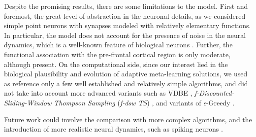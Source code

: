 Despite the promising results, there are some limitations to the model. First and foremost, the great level of abstraction in the neuronal details, as we considered simple point neurons with synapses modeled with relatively elementary functions.
In particular, the model does not account for the presence of noise in the neural dynamics, which is a well-known feature of biological neurons \cite{faisalNoiseNeuronsOther2012}.
Further, the functional association with the pre-frontal cortical region is only moderate, although present.
On the computational side, since our interest lied in the biological plausibility and evolution of adaptive meta-learning solutions, we used as reference only a few well established and relatively simple algorithms, and did not take into account more advanced variants such as VDBE
\cite{tokicAdaptiveEGreedyExploration2010, tokicValueDifferenceBasedExploration2011}, \textit{f-Discounted-Sliding-Window Thompson Sampling} (\textit{f-dsw TS}) \cite{cavenaghiNonStationaryMultiArmed2021}, and variants of $\epsilon$-Greedy \cite{qiForcedExplorationBandit2023}.

Future work could involve the comparison with more complex algorithms, and the introduction of more realistic neural dynamics, such as spiking neurons \cite{nunesSpikingNeuralNetworks2022}.

